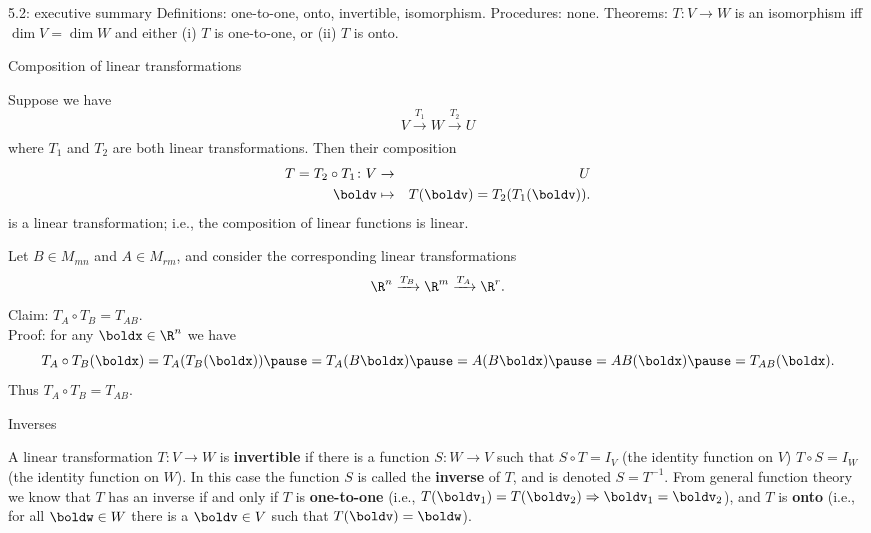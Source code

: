 \begin{frame}{5.2: executive summary}
\alert{Definitions:} one-to-one, onto, invertible, isomorphism.
\bspace
\alert{Procedures:} none.
\bspace
\alert{Theorems:} $T\colon V\rightarrow W$ is an isomorphism iff $\dim V=\dim W$ and either (i) $T$ is one-to-one, or (ii) $T$ is onto.
\end{frame}
\begin{frame}{Composition of linear transformations}
\footnotesize
\begin{theorem}
Suppose we have 
\[
V\xrightarrow[]{T_1} W\xrightarrow[]{T_2}U
\]
where $T_1$ and $T_2$ are both linear transformations. Then their composition 
\begin{eqnarray*}
T=T_2\circ T_1\colon V&\rightarrow& U\\
\boldv&\mapsto& T(\boldv)=T_2(T_1(\boldv)). 
\end{eqnarray*}
is a linear transformation; i.e., the composition of linear functions is linear. 
\end{theorem}
\pause
\begin{example}
Let $B\in M_{mn}$ and $A\in M_{rm}$, and consider the corresponding linear transformations
\[
\R^n\xrightarrow[]{T_B} \R^m\xrightarrow[]{T_A}\R^r.
\]
\pause
Claim: $T_A\circ T_B=T_{AB}$. \\
\pause Proof: for any $\boldx\in\R^n$ we have 
\[
T_A\circ T_B(\boldx)=T_A(T_B(\boldx))\pause=T_A(B\boldx)\pause=A(B\boldx)\pause=AB(\boldx)\pause=T_{AB}(\boldx).
\]
Thus $T_A\circ T_B=T_{AB}$. 
\end{example}
\end{frame}
\begin{frame}{Inverses}
\footnotesize
\begin{definition}
A linear transformation $T\colon V\rightarrow W$ is {\bf invertible} if there is a function 
$S\colon W\rightarrow V$ such that
\bb[(i)]
\ii $S\circ T=I_V$ (the identity function on $V$)
\ii $T\circ S=I_W$(the identity function on $W$).
\ee
In this case the function $S$ is called the {\bf inverse} of $T$, and is denoted $S=T^{-1}$. 
\bpause
From general function theory we know that $T$ has an inverse if and only if 
\bb
\ii $T$ is {\bf one-to-one} (i.e., $T(\boldv_1)=T(\boldv_2)\Rightarrow \boldv_1=\boldv_2$), and  
\ii $T$ is {\bf onto} (i.e., for all $\boldw\in W$ there is a $\boldv\in V$ such that $T(\boldv)=\boldw$). 
\ee 
\end{definition}
\end{frame}
